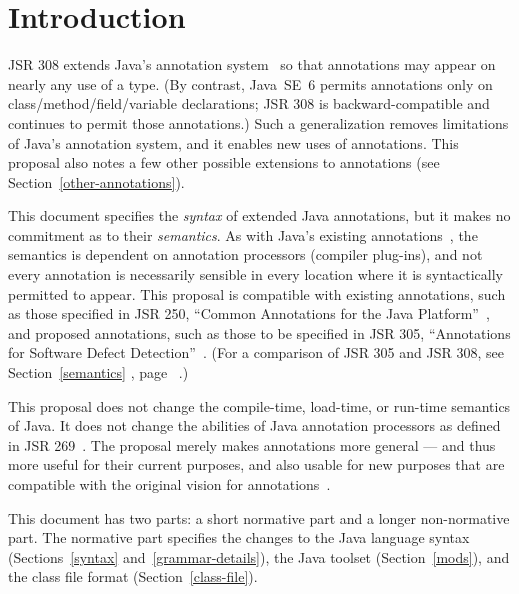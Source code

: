 \documentclass[10pt]{article}
\begin{document}
\tableofcontents

\section{Introduction\label{intro}}

JSR 308 extends Java's annotation system~\cite{JSR175} so that
annotations may appear on nearly any use of a type.
(By contrast, Java~SE~6 permits annotations only on
class/method/field/variable declarations; JSR 308 is
backward-compatible and continues to permit those annotations.)
Such a generalization removes
limitations of Java's annotation
system, and it enables new uses of annotations.
This proposal also notes a few other possible extensions to annotations (see Section~\ref{other-annotations}).

This document specifies the \emph{syntax} of extended Java annotations, but
it makes no commitment as to their \emph{semantics}.  As with Java's
existing annotations~\cite{JSR175}, the semantics is dependent on annotation processors
(compiler plug-ins), and not every annotation is necessarily sensible in
every location where it is syntactically permitted to appear.
This proposal is compatible with existing annotations,
such as those specified in JSR 250, ``Common Annotations for the Java
Platform''~\cite{JSR250}, and proposed annotations, such as those to be
specified in JSR 305, ``Annotations for Software Defect
Detection''~\cite{JSR305}.  (For a comparison of JSR 305 and JSR 308, see Section~\ref{semantics}%
, page~\pageref{semantics}%
.)

This proposal does not change the compile-time, load-time, or run-time
semantics of Java.  It does not change the abilities of Java annotation
processors as defined in JSR 269~\cite{JSR269}.
The proposal merely makes annotations more general --- and thus more useful
for their current purposes, and also usable for new purposes that are
compatible with the original vision for annotations~\cite{JSR175}.

This document has two parts:  a short normative part and a longer
non-normative part.
The normative part specifies the changes to
the Java language syntax (Sections~\ref{syntax} and~\ref{grammar-details}),
the Java toolset (Section~\ref{mods}), and
the class file format (Section~\ref{class-file}).
\end{document}
